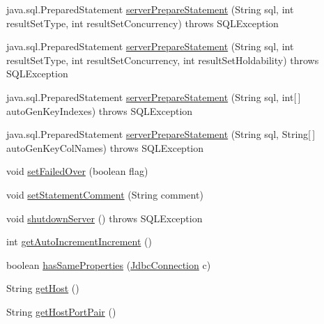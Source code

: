 \begin{DoxyCompactItemize}
\item 
java.\+sql.\+Prepared\+Statement \mbox{\hyperlink{interfacecom_1_1mysql_1_1cj_1_1jdbc_1_1_jdbc_connection_aa0692efe53cb2eea133274bedbacd26a}{server\+Prepare\+Statement}} (String sql, int result\+Set\+Type, int result\+Set\+Concurrency)  throws S\+Q\+L\+Exception
\item 
java.\+sql.\+Prepared\+Statement \mbox{\hyperlink{interfacecom_1_1mysql_1_1cj_1_1jdbc_1_1_jdbc_connection_a0c300ea92f3c97874b104b5e999b440b}{server\+Prepare\+Statement}} (String sql, int result\+Set\+Type, int result\+Set\+Concurrency, int result\+Set\+Holdability)  throws S\+Q\+L\+Exception
\item 
java.\+sql.\+Prepared\+Statement \mbox{\hyperlink{interfacecom_1_1mysql_1_1cj_1_1jdbc_1_1_jdbc_connection_aefdad3d71436ba1c80d2cb1e8419dfba}{server\+Prepare\+Statement}} (String sql, int\mbox{[}$\,$\mbox{]} auto\+Gen\+Key\+Indexes)  throws S\+Q\+L\+Exception
\item 
java.\+sql.\+Prepared\+Statement \mbox{\hyperlink{interfacecom_1_1mysql_1_1cj_1_1jdbc_1_1_jdbc_connection_aa15ffc32d47d1950257c4720802694bf}{server\+Prepare\+Statement}} (String sql, String\mbox{[}$\,$\mbox{]} auto\+Gen\+Key\+Col\+Names)  throws S\+Q\+L\+Exception
\item 
void \mbox{\hyperlink{interfacecom_1_1mysql_1_1cj_1_1jdbc_1_1_jdbc_connection_a65cb0cc5d2afc54002bfc16222bbe402}{set\+Failed\+Over}} (boolean flag)
\item 
void \mbox{\hyperlink{interfacecom_1_1mysql_1_1cj_1_1jdbc_1_1_jdbc_connection_adfbd59fbebd013673ed3eb97beb76179}{set\+Statement\+Comment}} (String comment)
\item 
void \mbox{\hyperlink{interfacecom_1_1mysql_1_1cj_1_1jdbc_1_1_jdbc_connection_ad9bedf228ed2ec194197ac2ceb960a94}{shutdown\+Server}} ()  throws S\+Q\+L\+Exception
\item 
int \mbox{\hyperlink{interfacecom_1_1mysql_1_1cj_1_1jdbc_1_1_jdbc_connection_a06ded1274e682178c67fdb86f09fed5a}{get\+Auto\+Increment\+Increment}} ()
\item 
boolean \mbox{\hyperlink{interfacecom_1_1mysql_1_1cj_1_1jdbc_1_1_jdbc_connection_a10b46302ae879b80a889ad9cc22ee9ed}{has\+Same\+Properties}} (\mbox{\hyperlink{interfacecom_1_1mysql_1_1cj_1_1jdbc_1_1_jdbc_connection}{Jdbc\+Connection}} c)
\item 
String \mbox{\hyperlink{interfacecom_1_1mysql_1_1cj_1_1jdbc_1_1_jdbc_connection_a2cadbe78f509f56fb4461f81ae10934e}{get\+Host}} ()
\item 
String \mbox{\hyperlink{interfacecom_1_1mysql_1_1cj_1_1jdbc_1_1_jdbc_connection_aa0cc0cf69f201efa68eecad1d7a62eef}{get\+Host\+Port\+Pair}} ()

\end{DoxyCompactItemize}
